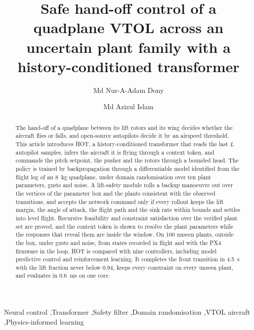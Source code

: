 \documentclass[final,5p,times,twocolumn]{elsarticle}
\newcommand{\hotEvalMs}{0.6}
\newcommand{\hotFrontLf}{0.94}
\newcommand{\hotFrontT}{4.5}
\newcommand{\numCross}{100}
\begin{document}
\begin{frontmatter}
\title{Safe hand-off control of a quadplane VTOL across an uncertain plant family with a history-conditioned transformer}
\author[tt]{Md Nur-A-Adam Dony}
\author[kl]{Md Azizul Islam}
\begin{abstract}

The hand-off of a quadplane between its lift rotors and its wing decides whether the aircraft flies or falls, and open-source autopilots decide it by an airspeed threshold. This article introduces HOT, a history-conditioned transformer that reads the last $L$ autopilot samples, infers the aircraft it is flying through a context token, and commands the pitch setpoint, the pusher and the rotors through a bounded head. The policy is trained by backpropagation through a differentiable model identified from the flight log of an \SI{8}{kg} quadplane, under domain randomisation over ten plant parameters, gusts and noise. A lift-safety module rolls a backup manoeuvre out over the vertices of the parameter box and the plants consistent with the observed transitions, and accepts the network command only if every rollout keeps the lift margin, the angle of attack, the flight path and the sink rate within bounds and settles into level flight. Recursive feasibility and constraint satisfaction over the verified plant set are proved, and the context token is shown to resolve the plant parameters while the responses that reveal them are inside the window. On \numCross{} unseen plants, outside the box, under gusts and noise, from states recorded in flight and with the PX4 firmware in the loop, HOT is compared with nine controllers, including model predictive control and reinforcement learning. It completes the front transition in \hotFrontT{}~s with the lift fraction never below \hotFrontLf{}, keeps every constraint on every unseen plant, and evaluates in \hotEvalMs{}~ms on one core.


\end{abstract}
\begin{keyword}
Neural control \sep Transformer \sep Safety filter \sep Domain randomisation \sep VTOL aircraft \sep Physics-informed learning
\end{keyword}
\end{frontmatter}
\end{document}
